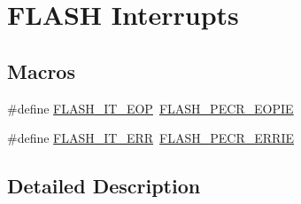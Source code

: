 \hypertarget{group___f_l_a_s_h___interrupts}{\section{F\-L\-A\-S\-H Interrupts}
\label{group___f_l_a_s_h___interrupts}
}
\subsection*{Macros}
\begin{DoxyCompactItemize}
\item 
\#define \hyperlink{group___f_l_a_s_h___interrupts_gaea20e80e1806d58a7544cfe8659e7f11}{F\-L\-A\-S\-H\-\_\-\-I\-T\-\_\-\-E\-O\-P}~\hyperlink{group___peripheral___registers___bits___definition_ga3c2cb29eb967e20a8a7fc479f79f79b2}{F\-L\-A\-S\-H\-\_\-\-P\-E\-C\-R\-\_\-\-E\-O\-P\-I\-E}
\item 
\#define \hyperlink{group___f_l_a_s_h___interrupts_ga4e2c23ab8c1b9a5ee49bf6d695d9ae8c}{F\-L\-A\-S\-H\-\_\-\-I\-T\-\_\-\-E\-R\-R}~\hyperlink{group___peripheral___registers___bits___definition_ga3b0d22c92f0036684b38aa94bdcf62a1}{F\-L\-A\-S\-H\-\_\-\-P\-E\-C\-R\-\_\-\-E\-R\-R\-I\-E}
\end{DoxyCompactItemize}


\subsection{Detailed Description}


